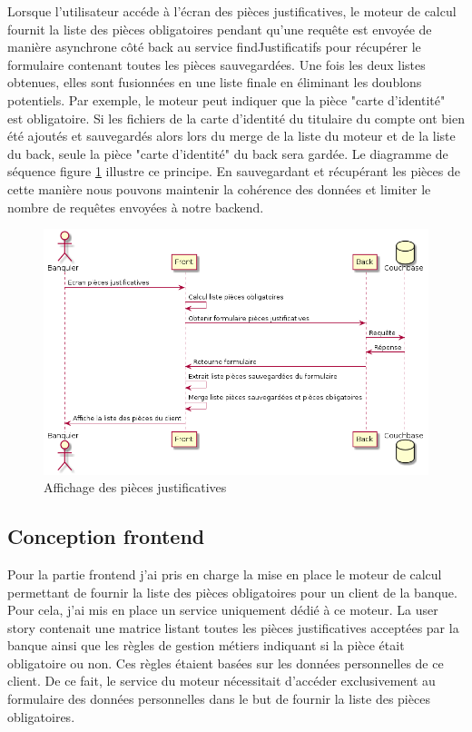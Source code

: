 	Lorsque l'utilisateur accéde à l'écran des pièces justificatives, le moteur de calcul fournit la liste des pièces obligatoires pendant qu'une requête est envoyée de manière asynchrone côté back au service findJustificatifs pour récupérer le formulaire contenant toutes les pièces sauvegardées. Une fois les deux listes obtenues, elles sont fusionnées en une liste finale en éliminant les doublons potentiels. Par exemple, le moteur peut indiquer que la pièce "carte d'identité" est obligatoire. Si les fichiers de la carte d'identité du titulaire du compte ont bien été ajoutés et sauvegardés alors lors du merge de la liste du moteur et de la liste du back, seule la pièce "carte d'identité" du back sera gardée. Le diagramme de séquence figure \ref{seqGet} illustre ce principe. En sauvegardant et récupérant les pièces de cette manière nous pouvons maintenir la cohérence des données et limiter le nombre de requêtes envoyées à notre backend. \\

\begin{figure}[h!]
	\includegraphics[scale=0.55]{images/travailBP1818/piecesJustif/seqGet.png}
	\centering
	\caption{Affichage des pièces justificatives}
	\label{seqGet}
\end{figure}

\subsection{Conception frontend}
	
	Pour la partie frontend j'ai pris en charge la mise en place le moteur de calcul permettant de fournir la liste des pièces obligatoires pour un client de la banque. Pour cela, j'ai mis en place un service uniquement dédié à ce moteur. La user story contenait une matrice listant toutes les pièces justificatives acceptées par la banque ainsi que les règles de gestion métiers indiquant si la pièce était obligatoire ou non. Ces règles étaient basées sur les données personnelles de ce client. De ce fait, le service du moteur nécessitait d'accéder exclusivement au formulaire des données personnelles dans le but de fournir la liste des pièces obligatoires. \\
	
